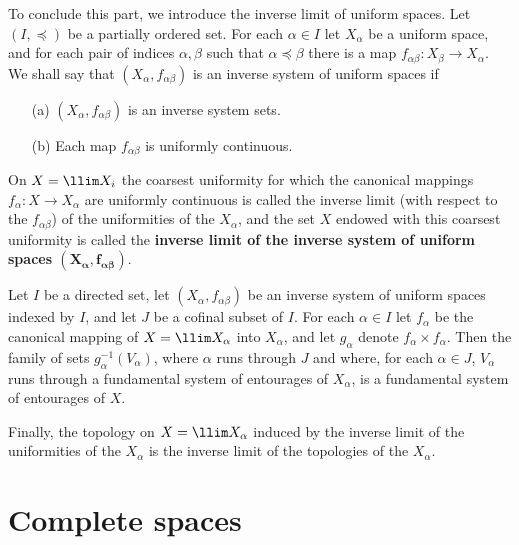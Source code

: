 To conclude this part, we introduce the inverse limit of uniform spaces. Let $(I,\preceq)$ be a partially ordered set. For each $\alpha\in I$ let $X_\alpha$ be a uniform space, and for each pair of indices $\alpha,\beta$ such that $\alpha\preceq\beta$ there is a map $f_{\alpha\beta}:X_\beta\to X_\alpha$. We shall say that $(X_\alpha,f_{\alpha\beta})$ is an inverse system of uniform spaces if 
\begin{itemize}
\item[(a)] $(X_\alpha,f_{\alpha\beta})$ is an inverse system sets.
\item[(b)] Each map $f_{\alpha\beta}$ is uniformly continuous.
\end{itemize}
On $X=\llim X_i$ the coarsest uniformity for which the canonical mappings $f_\alpha:X\to X_\alpha$ are uniformly continuous is called the inverse limit (with respect to the $f_{\alpha\beta}$) of the uniformities of the $X_\alpha$, and the set $X$ endowed with this coarsest uniformity is called the \textbf{inverse limit of the inverse system of uniform spaces $\bm{(X_{\alpha},f_{\alpha\beta})}$}.
\begin{proposition}
Let $I$ be a directed set, let $(X_\alpha,f_{\alpha\beta})$ be an inverse system of uniform spaces indexed by $I$, and let $J$ be a cofinal subset of $I$. For each $\alpha\in I$ let $f_\alpha$ be the canonical mapping of $X=\llim X_\alpha$ into $X_\alpha$, and let $g_\alpha$ denote $f_\alpha\times f_\alpha$. Then the family of sets $g_\alpha^{-1}(V_\alpha)$, where $\alpha$ runs through $J$ and where, for each $\alpha\in J$, $V_\alpha$ runs through a fundamental system of entourages of $X_\alpha$, is a fundamental system of entourages of $X$.
\end{proposition}
Finally, the topology on $X=\llim X_\alpha$ induced by the inverse limit of the uniformities of the $X_\alpha$ is the inverse limit of the topologies of the $X_\alpha$.
\section{Complete spaces}
